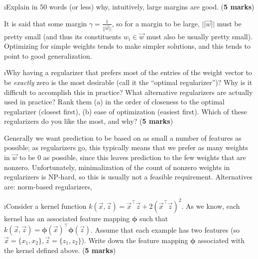 \documentclass[fleqn]{article}
\begin{document}
\i Explain in 50 words (or less) why, intuitively, large margins are good. (\textbf{5 marks})

\begin{solution}
It is said that some margin $\gamma = \frac{1}{||\vec{w}||}$, so for a margin to be large, $||\vec{w}||$ must be pretty small (and thus its constituents $w_i \in \vec{w}$ must also be usually pretty small). Optimizing for simple weights tends to make simpler solutions, and this tends to point to good generalization.
\end{solution}

\i Why having a regularizer that prefers most of the entries of the weight
vector to be \textit{exactly} zero is the most desirable (call it the ``optimal
regularizer'')? Why is it difficult to accomplish this in practice? What 
alternative regularizers are actually used in practice? Rank them (a) in the order
of closeness to the optimal regularizer (closest first), (b) ease of optimization
(easiest first). Which of these regularizers do you like the most, and why?
(\textbf{5 marks})

\begin{solution}
Generally we want prediction to be based on as small a number of features as possible; as regularizers go, this typically means that we prefer as many weights in $\vec{w}$ to be $0$ as possible, since this leaves prediction to the few weights that are nonzero. Unfortunately, minimalization of the count of nonzero weights in regularizers is NP-hard, so this is usually not a feasible requirement. Alternatives are: norm-based regularizers,
\end{solution}

\i Consider a kernel function $k(\vec{x},\vec{z}) = \vec{x}^\top \vec{z}
+ 2(\vec{x}^\top \vec{z})^2$. As we know, each kernel has an associated 
feature mapping $\boldsymbol{\phi}$ such that $k(\vec{x},\vec{z}) 
= \boldsymbol{\phi}(\vec{x})^\top \boldsymbol{\phi}(\vec{z})$. Assume that
each example has two features (so $\vec{x} = \{x_1,x_2\}, \vec{z} = \{z_1,z_2\}$). 
Write down the feature mapping $\boldsymbol{\phi}$ associated with 
the kernel defined above. (\textbf{5 marks})
\end{document}
